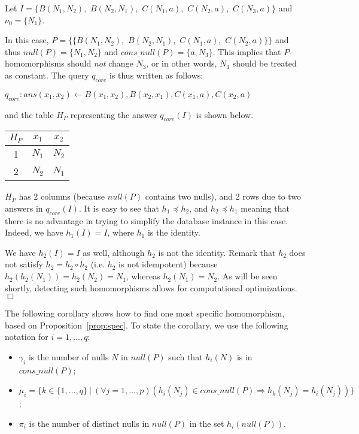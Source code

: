 \begin{example}\label{ex:most-spec}
    {\rm
        Let $I=\{B(N_1,N_2),$ $B(N_2,N_1),$ $C(N_1,a),$ $C(N_2,a),$ $C(N_3,a)\}$ and $\nu_0=\{N_1\}$.

        In this case, $P=\{\{B(N_1,N_2),$ $B(N_2,N_1),$ $C(N_1,a),$ $C(N_2,a)\}\}$ and thus $null(P)=\{N_1, N_2\}$ and $cons\_null(P)=\{a, N_3\}$.
        This implies that $P$-homomorphisms should \emph{not} change $N_3$, or in other words, $N_3$ should be treated as constant.
        The query $q_{core}$ is thus written as follows:

        $q_{core}: ans(x_1,x_2) \leftarrow B(x_1,x_2),B(x_2,x_1),C(x_1,a),C(x_2,a)$

        \smallskip\noindent
        and the table $H_P$ representing the answer $q_{core}(I)$ is shown below.

        \begin{center}
            \begin{tabular}{c|cc}
                $H_P$ & $x_1$  & $x_2$ \\ \hline
                1     & $N_1 $ & $N_2$ \\
                2     & $N_2 $ & $N_1$ \\
            \end{tabular}
        \end{center}

        $H_P$ has 2 columns (because $null(P)$ contains two nulls), and 2 rows due to two answers in $q_{core}(I)$.
        It is easy to see that $h_1 \preceq h_2$, and $h_2 \preceq h_1$ meaning that there is no advantage in trying to simplify the database instance in this case.
        Indeed, we have $h_1(I) = I$, where $h_1$ is the identity.

        We have $h_2(I) = I$ as well, although $h_2 $ is not the identity.
        Remark that $h_2$ does not satisfy $h_2 = h_2 \circ h_2$ (i.e. $h_2$ is not idempotent) because $h_2(h_2(N_1))=h_2(N_2)=N_1$, whereas $h_2(N_1)=N_2$.
        As will be seen shortly, detecting such homomorphisms allows for computational optimizations.
        \hfill$\Box$}
\end{example}

The following corollary shows how to find one most specific homomorphism, based on Proposition~\ref{prop:spec}.
To state the corollary, we use the following notation for $i=1, \ldots,q$:
\begin{itemize}
    \item
          $\gamma_i$ is the number of nulls $N$ in $null(P)$ such that $h_i(N)$ is in $cons\_null(P)$;
    \item
          $\mu_i=\{k \in \{1, \ldots, q\}~|~(\forall j=1, \ldots, p) (h_i(N_j) \in cons\_null(P) \Rightarrow h_k(N_j) = h_i(N_j))\}$;
    \item
          $\pi_i$ is the number of distinct nulls in $null(P)$ in the set $h_i(null(P))$.
\end{itemize}

